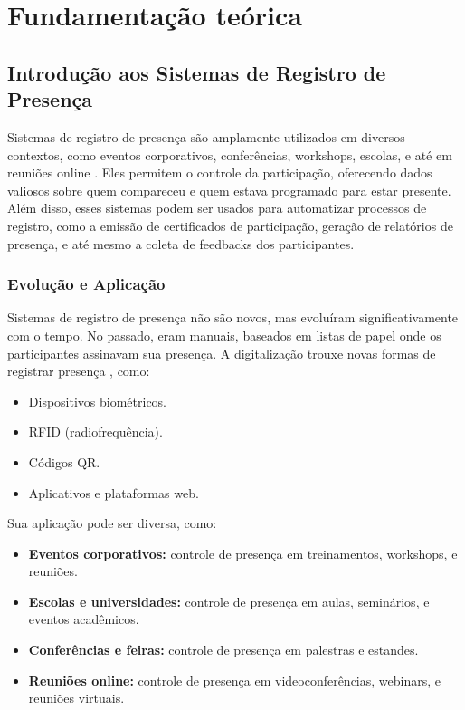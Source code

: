 \section{Fundamentação teórica}
\label{sec:fundamentacao_teorica}

\subsection{Introdução aos Sistemas de Registro de Presença}
Sistemas de registro de presença são amplamente utilizados em diversos contextos, como eventos corporativos, conferências, workshops, escolas, e até em reuniões online \cite{ferreira2023}. Eles permitem o controle da participação, oferecendo dados valiosos sobre quem compareceu e quem estava programado para estar presente. Além disso, esses sistemas podem ser usados para automatizar processos de registro, como a emissão de certificados de participação, geração de relatórios de presença, e até mesmo a coleta de feedbacks dos participantes.

\subsubsection{Evolução e Aplicação}
Sistemas de registro de presença não são novos, mas evoluíram significativamente com o tempo. No passado, eram manuais, baseados em listas de papel onde os participantes assinavam sua presença. A digitalização trouxe novas formas de registrar presença \cite{qureshi2024}, como:
\begin{itemize}
    \item Dispositivos biométricos.
    \item RFID (radiofrequência).
    \item Códigos QR.
    \item Aplicativos e plataformas web.
\end{itemize}

Sua aplicação pode ser diversa, como:
\begin{itemize}
    \item \textbf{Eventos corporativos:} controle de presença em treinamentos, workshops, e reuniões.
    \item \textbf{Escolas e universidades:} controle de presença em aulas, seminários, e eventos acadêmicos.
    \item \textbf{Conferências e feiras:} controle de presença em palestras e estandes.
    \item \textbf{Reuniões online:} controle de presença em videoconferências, webinars, e reuniões virtuais.
\end{itemize}

